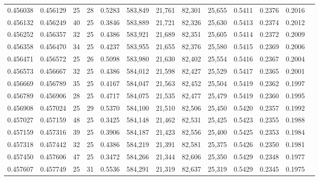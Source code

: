 \begin{tabular}{rrrrrrrrrrrrr}
0.456038 & 0.456129 &    25 &  28 &                                     0.5283 & 583,849 &  21,761 &  82,301 &  25,655 & 0.5411 & 0.2376 & 0.2016 \\
0.456132 & 0.456249 &    40 &  25 &                                     0.3846 & 583,889 &  21,721 &  82,326 &  25,630 & 0.5413 & 0.2374 & 0.2012 \\
0.456252 & 0.456357 &    32 &  25 &                                     0.4386 & 583,921 &  21,689 &  82,351 &  25,605 & 0.5414 & 0.2372 & 0.2009 \\
0.456358 & 0.456470 &    34 &  25 &                                     0.4237 & 583,955 &  21,655 &  82,376 &  25,580 & 0.5415 & 0.2369 & 0.2006 \\
0.456471 & 0.456572 &    25 &  26 &                                     0.5098 & 583,980 &  21,630 &  82,402 &  25,554 & 0.5416 & 0.2367 & 0.2004 \\
0.456573 & 0.456667 &    32 &  25 &                                     0.4386 & 584,012 &  21,598 &  82,427 &  25,529 & 0.5417 & 0.2365 & 0.2001 \\
0.456669 & 0.456789 &    35 &  25 &                                     0.4167 & 584,047 &  21,563 &  82,452 &  25,504 & 0.5419 & 0.2362 & 0.1997 \\
0.456789 & 0.456906 &    28 &  25 &                                     0.4717 & 584,075 &  21,535 &  82,477 &  25,479 & 0.5419 & 0.2360 & 0.1995 \\
0.456908 & 0.457024 &    25 &  29 &                                     0.5370 & 584,100 &  21,510 &  82,506 &  25,450 & 0.5420 & 0.2357 & 0.1992 \\
0.457027 & 0.457159 &    48 &  25 &                                     0.3425 & 584,148 &  21,462 &  82,531 &  25,425 & 0.5423 & 0.2355 & 0.1988 \\
0.457159 & 0.457316 &    39 &  25 &                                     0.3906 & 584,187 &  21,423 &  82,556 &  25,400 & 0.5425 & 0.2353 & 0.1984 \\
0.457318 & 0.457442 &    32 &  25 &                                     0.4386 & 584,219 &  21,391 &  82,581 &  25,375 & 0.5426 & 0.2350 & 0.1981 \\
0.457450 & 0.457606 &    47 &  25 &                                     0.3472 & 584,266 &  21,344 &  82,606 &  25,350 & 0.5429 & 0.2348 & 0.1977 \\
0.457607 & 0.457749 &    25 &  31 &                                     0.5536 & 584,291 &  21,319 &  82,637 &  25,319 & 0.5429 & 0.2345 & 0.1975 \\

\end{tabular}

